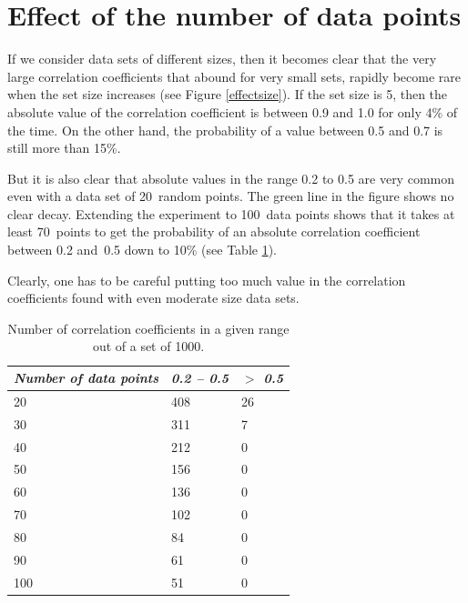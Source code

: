\documentclass[onecolumn]{article}
\begin{document}
\section*{Effect of the number of data points}
If we consider data sets of different sizes, then it becomes clear that the very large correlation coefficients
that abound for very small sets, rapidly become rare when the set size increases (see Figure \ref{effectsize}).
If the set size is 5, then the absolute value of the correlation coefficient is between 0.9 and 1.0 for only
4\% of the time. On the other hand, the probability of a value between 0.5 and 0.7 is still more than 15\%.

But it is also clear that absolute values in the range 0.2 to 0.5 are very common even with a data set of
20~random points. The green line in the figure shows no clear decay. Extending the experiment to 100~data points
shows that it takes at least 70~points to get the probability of an absolute correlation coefficient between 0.2 and~0.5
down to 10\% (see Table \ref{table100}).

Clearly, one has to be careful putting too much value in the correlation coefficients found with even moderate size
data sets.

\begin{table}[h!]
\center
\caption{Number of correlation coefficients in a given range out of a set of 1000.}
\label{table100}
\begin{tabular}{lll}
\hline
\emph{Number of data points} & \emph{0.2 -- 0.5} & \emph{$>$ 0.5} \\
\hline
          20                 &           408     &     26        \\
          30                 &           311     &      7        \\
          40                 &           212     &      0        \\
          50                 &           156     &      0        \\
          60                 &           136     &      0        \\
          70                 &           102     &      0        \\
          80                 &           84      &      0        \\
          90                 &           61      &      0        \\
          100                &           51      &      0        \\
\hline
\end{tabular}
\end{table}
\end{document}
